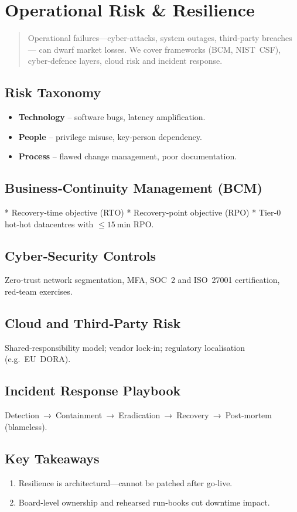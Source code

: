 \chapter{Operational Risk \& Resilience}\label{ch:oprisk}

\begin{abstract}
Operational failures—cyber‑attacks, system outages, third‑party breaches—
can dwarf market losses.  We cover frameworks (BCM, NIST CSF),
cyber‑defence layers, cloud risk and incident response.
\end{abstract}

\section{Risk Taxonomy}

\begin{itemize}
  \item \textbf{Technology} – software bugs, latency amplification.
  \item \textbf{People} – privilege misuse, key‑person dependency.
  \item \textbf{Process} – flawed change management, poor documentation.
\end{itemize}

\section{Business‑Continuity Management (BCM)}

* Recovery‑time objective (RTO)  
* Recovery‑point objective (RPO)  
* Tier‑0 hot‑hot datacentres with \(\le\SI{15}{\minute}\) RPO.

\section{Cyber‑Security Controls}

Zero‑trust network segmentation, MFA, SOC 2 and ISO 27001 certification,
red‑team exercises.

\section{Cloud and Third‑Party Risk}

Shared‑responsibility model; vendor lock‑in; regulatory localisation
(e.g.\ EU DORA).

\section{Incident Response Playbook}

Detection → Containment → Eradication → Recovery → Post‑mortem (blameless).

\section*{Key Takeaways}
\begin{enumerate}
  \item Resilience is architectural—cannot be patched after go‑live.
  \item Board‑level ownership and rehearsed run‑books cut downtime impact.
\end{enumerate}
